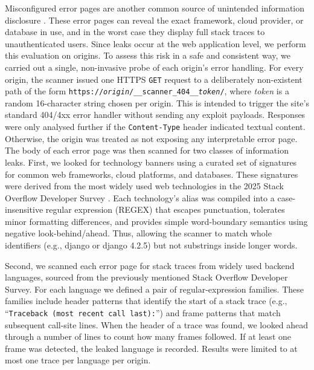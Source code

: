 \documentclass[pdflatex,sn-mathphys-num]{sn-jnl}
\numberwithin{equation}{section}
\theoremstyle{thmstyleone}
\theoremstyle{thmstyletwo}%
\theoremstyle{thmstylethree}%
\begin{document}
\vspace{1em}Misconfigured error pages are another common source of unintended information disclosure 
\cite{owasp_top10_a05_2021,owasp_error_handling,cwe_209}. These error pages can reveal the exact framework, cloud provider, or 
database in use, and in the worst case they display full stack traces to unauthenticated users. Since leaks occur at the web application level, we perform this evaluation
on origins. To assess this risk in a safe and consistent way, we carried out a
single, non-invasive probe of each origin's error handling. For every origin, the scanner issued one HTTPS \texttt{GET} request to a deliberately non-existent path of the form 
\texttt{https://\textit{origin}/\_\_scanner\_404\_\_\textit{token}/}, where \textit{token} is a 
random 16-character string chosen per origin. This is
intended to trigger the site's standard 404/4xx error handler without sending any exploit payloads. 
Responses were only analysed further if the \texttt{Content-Type} header indicated textual 
content. 
Otherwise, the origin was treated as not exposing any interpretable error page. The body of each error page was then scanned for two classes of
information leaks. First, we looked for technology banners using a curated set of signatures for common web frameworks, cloud platforms, and databases. These signatures
were derived from the most widely used web technologies in the 2025 Stack Overflow Developer Survey \cite{stackoverflow_survey_2025}. 
Each technology's alias was compiled into a case-insensitive regular expression (REGEX) that escapes punctuation, tolerates 
minor formatting differences, and provides simple word-boundary semantics using negative look-behind/ahead. Thus, allowing the scanner to match whole 
identifiers (e.g., django or django 4.2.5) but not substrings inside longer words.

\vspace{1em}Second, we scanned each error page for stack traces from widely used backend languages, sourced from the previously mentioned Stack Overflow Developer Survey. For
each language we defined a pair of regular-expression families. These families include header patterns
that identify the start of a stack trace (e.g., ``\texttt{Traceback (most recent call last):}'') and frame patterns that match subsequent call-site lines. 
When the header of a trace was found, we looked ahead through a number of lines to count how many frames followed. If at least one frame was detected, 
the leaked language is recorded. Results were limited to at most one trace per language per origin.
\end{document}
